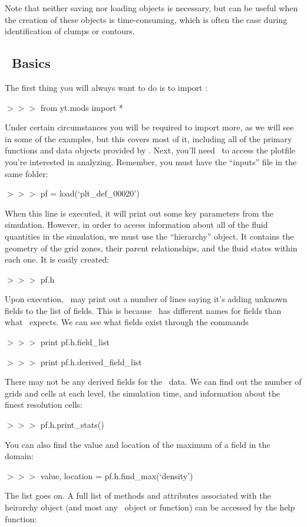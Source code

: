 Note that neither saving nor loading objects is necessary, but can be
useful when the creation of these objects is time-consuming, which is
often the case during identification of clumps or contours.

\subsection{\yt\ Basics}

The first thing you will always want to do is to import \yt:

{{\scriptsize$>>>$}} from yt.mods import *

Under certain circumstances you will be required to import more, as we
will see in some of the examples, but this covers most of it,
including all of the primary functions and data objects provided by
\yt. Next, you'll need \yt\ to access the plotfile you're interested in
analyzing. Remember, you must have the ``inputs'' file in the same
folder:

{\scriptsize$>>>$} pf = load(`plt\_def\_00020')

When this line is executed, it will print out some key parameters from
the simulation. However, in order to access information about all of
the fluid quantities in the simulation, we must use the ``hierarchy''
object. It contains the geometry of the grid zones, their parent
relationships, and the fluid states within each one. It is easily
created:

{\scriptsize$>>>$} pf.h

Upon execution, \yt\ may print out a number of lines saying it's adding
unknown fields to the list of fields. This is because \iamr\ has
different names for fields than what \yt\ expects. We can see what
fields exist through the commands

{\scriptsize$>>>$} print pf.h.field\_list

{\scriptsize$>>>$} print pf.h.derived\_field\_list

There may not be any derived fields for the \iamr\ data. We can find out
the number of grids and cells at each level, the simulation time, and
information about the finest resolution cells:

{\scriptsize$>>>$} pf.h.print\_stats()

You can also find the value and location of the maximum of a field in
the domain:

{\scriptsize$>>>$} value, location = pf.h.find\_max(`density')

The list goes on. A full list of methods and attributes associated
with the heirarchy object (and most any \yt\ object or function) can be
accessed by the help function:

